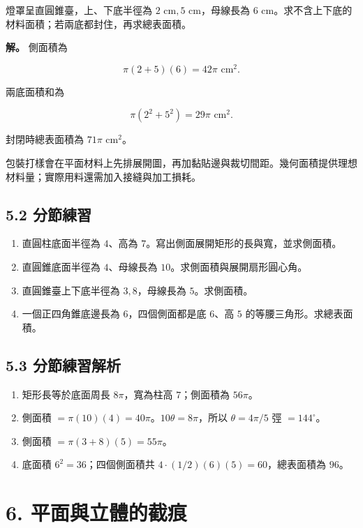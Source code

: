 \documentclass[11pt,a4paper]{article}
\providecommand{\tightlist}{%
  \setlength{\itemsep}{0pt}\setlength{\parskip}{0pt}}
\begin{document}
燈罩呈直圓錐臺，上、下底半徑為 \(2\text{ cm},5\text{ cm}\)，母線長為 \(6\text{ cm}\)。求不含上下底的材料面積；若兩底都封住，再求總表面積。

\textbf{解。} 側面積為

\[
\pi(2+5)(6)=42\pi\text{ cm}^2.
\]

兩底面積和為

\[
\pi(2^2+5^2)=29\pi\text{ cm}^2.
\]

封閉時總表面積為 \(71\pi\text{ cm}^2\)。

包裝打樣會在平面材料上先排展開圖，再加黏貼邊與裁切間距。幾何面積提供理想材料量；實際用料還需加入接縫與加工損耗。

\subsection{5.2 分節練習}\label{ux5206ux7bc0ux7df4ux7fd2-4}

\begin{enumerate}
\def\labelenumi{\arabic{enumi}.}
\tightlist
\item
  直圓柱底面半徑為 \(4\)、高為 \(7\)。寫出側面展開矩形的長與寬，並求側面積。
\item
  直圓錐底面半徑為 \(4\)、母線長為 \(10\)。求側面積與展開扇形圓心角。
\item
  直圓錐臺上下底半徑為 \(3,8\)，母線長為 \(5\)。求側面積。
\item
  一個正四角錐底邊長為 \(6\)，四個側面都是底 \(6\)、高 \(5\) 的等腰三角形。求總表面積。
\end{enumerate}

\subsection{5.3 分節練習解析}\label{ux5206ux7bc0ux7df4ux7fd2ux89e3ux6790-4}

\begin{enumerate}
\def\labelenumi{\arabic{enumi}.}
\tightlist
\item
  矩形長等於底面周長 \(8\pi\)，寬為柱高 \(7\)；側面積為 \(56\pi\)。
\item
  側面積 \(=\pi(10)(4)=40\pi\)。\(10\theta=8\pi\)，所以 \(\theta=4\pi/5\) 弳 \(=144^\circ\)。
\item
  側面積 \(=\pi(3+8)(5)=55\pi\)。
\item
  底面積 \(6^2=36\)；四個側面積共 \(4\cdot(1/2)(6)(5)=60\)，總表面積為 \(96\)。
\end{enumerate}

\section{6. 平面與立體的截痕}\label{ux5e73ux9762ux8207ux7acbux9ad4ux7684ux622aux75d5}
\end{document}
